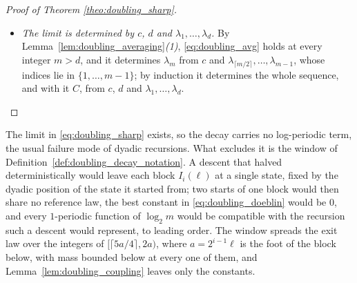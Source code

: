 \begin{proof}[Proof of Theorem \ref{theo:doubling_sharp}]
\begin{itemize}
    \begin{equation}
    \begin{aligned}
        (1-\omega)^{i}\;&=\;2^{-\alpha i}\;<\;\Bigl(\frac{2\ell}{m}\Bigr)^{\alpha}
        \;\leq\;\Bigl(\frac{4m^{\vartheta}}{m}\Bigr)^{\alpha}\\
        \;&=\;4^{\alpha}\,m^{-\alpha(1-\vartheta)}\;=\;4^{\alpha}\,m^{-\vartheta},
    \end{aligned}
    \end{equation}
    by $\ell\leq2m^{\vartheta}$ and $\alpha(1-\vartheta)=\alpha/(1+\alpha)=\vartheta$. Hence
    $|u_m-C|\leq c_2\bigl(4^{\alpha}+3c_3\bigr)m^{-\vartheta}$ at every integer $m\geq m_3$;
    and at $1\leq m<m_3$, both $u_m$ and $C$ lying in $[c_1,c_2]$,
    $|u_m-C|\leq c_2\leq c_2\,m_3^{\vartheta}\,m^{-\vartheta}$. So
    $c_6:=c_2\max\bigl(4^{\alpha}+3c_3,\,m_3^{\vartheta}\bigr)$ satisfies
    \eqref{eq:doubling_rate}, $u_j$ being $\lambda_j\,j^{p_*}$. It depends on $c$, $d$ and
    $\lambda_1,\dots,\lambda_{2m_0}$ alone: $\alpha$ and $\vartheta$ on $c$; $c_3$, $\ell_4$
    and with them $m_3$ on $c$ and $d$, by Lemmas~\ref{lem:doubling_weight}
    and~\ref{lem:doubling_doeblin}; and $c_2$ on $c$, $d$ and $\lambda_1,\dots,\lambda_{2m_0}$
    by Theorem~\ref{theo:doubling_decay}\emph{(2)}.
    \item \emph{The limit is determined by $c$, $d$ and $\lambda_1,\dots,\lambda_d$.} By
    Lemma~\ref{lem:doubling_averaging}\emph{(1)}, \eqref{eq:doubling_avg} holds at every
    integer $m>d$, and it determines $\lambda_m$ from $c$ and
    $\lambda_{\lceil m/2\rceil},\dots,\lambda_{m-1}$, whose indices lie in $\{1,\dots,m-1\}$;
    by induction it determines the whole sequence, and with it $C$, from $c$, $d$ and
    $\lambda_1,\dots,\lambda_d$.
\end{itemize}
\end{proof}

\begin{remark}\label{rem:doubling_no_logperiodic}
The limit in \eqref{eq:doubling_sharp} exists, so the decay carries no log-periodic term, the
usual failure mode of dyadic recursions. What excludes it is the window of
Definition~\ref{def:doubling_decay_notation}. A descent that halved deterministically would
leave each block $I_i(\ell)$ at a single state, fixed by the dyadic position of the state it
started from; two starts of one block would then share no reference law, the best constant in
\eqref{eq:doubling_doeblin} would be $0$, and every $1$-periodic function of $\log_2m$ would be
compatible with the recursion such a descent would represent, to leading order. The window spreads
the exit law over the integers of $[\lceil5a/4\rceil,2a)$, where $a=2^{i-1}\ell$ is the foot of
the block below, with mass bounded below at every one of them, and
Lemma~\ref{lem:doubling_coupling} leaves only the constants.
\end{remark}

